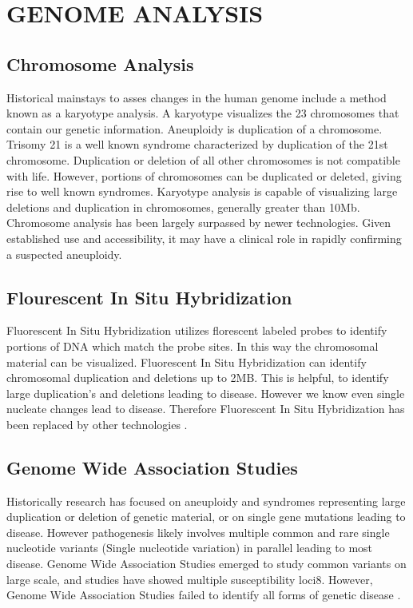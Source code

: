 \documentclass[sigconf]{acmart}
\begin{document}
\section{	GENOME ANALYSIS}

\subsection{Chromosome Analysis}
Historical mainstays to asses changes in the human genome include a method known as a karyotype analysis.  A karyotype visualizes the 23 chromosomes that contain our genetic information.    Aneuploidy is duplication of a chromosome.  Trisomy 21 is a well known syndrome characterized by duplication of the 21st chromosome.  Duplication or deletion of all other chromosomes is not compatible with life. However, portions of chromosomes can be duplicated or deleted, giving rise to well known syndromes.  Karyotype analysis is capable of visualizing large deletions and duplication in chromosomes, generally greater than 10Mb. Chromosome analysis has been largely surpassed by newer technologies.  Given established use and accessibility, it may have a clinical role in rapidly confirming a suspected aneuploidy. 

\subsection{Flourescent In Situ Hybridization}
Fluorescent In Situ Hybridization utilizes florescent labeled probes to identify portions of DNA which match the probe sites. In this way the chromosomal material can be visualized.   Fluorescent In Situ Hybridization can identify chromosomal duplication and deletions up to 2MB.  This is helpful, to identify large duplication's and deletions leading to disease.  However we know even single nucleate changes lead to disease. Therefore Fluorescent In Situ Hybridization has been replaced by other technologies \cite{amann2008single}.      

\subsection{Genome Wide Association Studies}
Historically research has focused on aneuploidy and syndromes representing large duplication or deletion of genetic material, or on single gene mutations leading to disease.  However pathogenesis likely involves multiple common and rare single nucleotide variants (Single nucleotide variation) in parallel leading to most disease.  Genome Wide Association Studies  emerged to study common variants on large scale, and studies have showed multiple susceptibility loci8.  However,  Genome Wide Association Studies failed to identify all forms of genetic disease \cite{visscher2012five}. 
\end{document}
